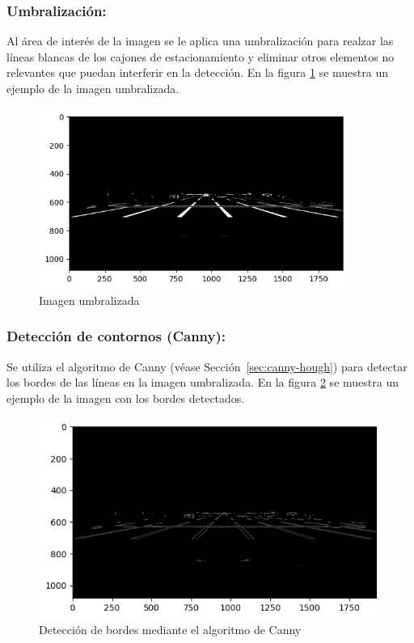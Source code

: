 \subsubsection{Umbralización:}
\noindent
Al área de interés de la imagen se le aplica una umbralización para realzar las líneas blancas de los cajones de estacionamiento
y eliminar otros elementos no relevantes que puedan interferir en la detección.
En la figura \ref{fig:threshold} se muestra un ejemplo de la imagen umbralizada.
\begin{figure}[!ht]
    \centering
    \includegraphics[width=0.9\textwidth]{img/reticule/thresholded}
    \caption{Imagen umbralizada}
    \label{fig:threshold}
\end{figure}

\subsubsection{Detección de contornos (Canny):}
\noindent
Se utiliza el algoritmo de Canny \cite{canny1986edge} (véase Sección~\ref{sec:canny-hough}) para detectar los bordes de las líneas en la imagen umbralizada.
En la figura \ref{fig:edges} se muestra un ejemplo de la imagen con los bordes detectados.
\begin{figure}[!ht]
    \centering
    \includegraphics[width=0.9  \textwidth]{img/reticule/canny}
    \caption{Detección de bordes mediante el algoritmo de Canny}
    \label{fig:edges}
\end{figure}

